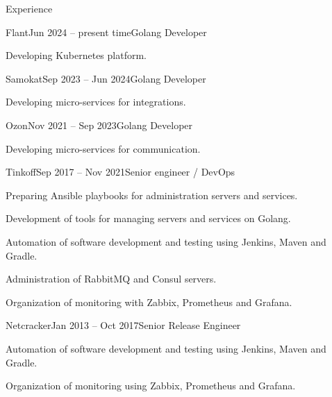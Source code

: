 \documentclass{resume} %
\begin{document}
\begin{rSection}{Experience}

\begin{rSubsection}{Flant}{Jun 2024 -- present time}{Golang Developer}{}
    \item Developing Kubernetes platform.
\end{rSubsection}
    
\begin{rSubsection}{Samokat}{Sep 2023 -- Jun 2024}{Golang Developer}{}
    \item Developing micro-services for integrations.
\end{rSubsection}

\begin{rSubsection}{Ozon}{Nov 2021 -- Sep 2023}{Golang Developer}{}
    \item Developing micro-services for communication.
\end{rSubsection}

\begin{rSubsection}{Tinkoff}{Sep 2017 -- Nov 2021}{Senior engineer / DevOps}{}
    \item Preparing Ansible playbooks for administration servers and services.
    \item Development of tools for managing servers and services on Golang.
    \item Automation of software development and testing using Jenkins, Maven and Gradle.
    \item Administration of RabbitMQ and Consul servers.
    \item Organization of monitoring with Zabbix, Prometheus and Grafana.
\end{rSubsection}

\begin{rSubsection}{Netcracker}{Jan 2013 -- Oct 2017}{Senior Release Engineer}{}
    \item Automation of software development and testing using Jenkins, Maven and Gradle.
    \item Organization of monitoring using Zabbix, Prometheus and Grafana.
\end{rSubsection}


\end{rSection}

\end{document}
